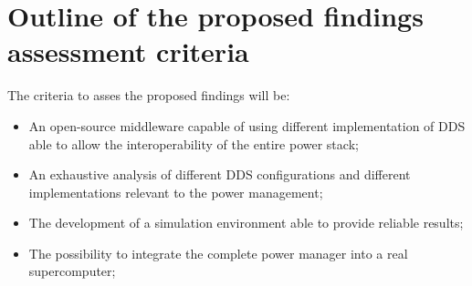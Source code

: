 \section{Outline of the proposed findings assessment criteria}
The criteria to asses the proposed findings will be:
\begin{itemize}
    \item An open-source middleware capable of using different implementation of DDS able to allow the interoperability of the entire power stack;
    \item An exhaustive analysis of different DDS configurations and different implementations relevant to the power management;
    \item The development of a simulation environment able to provide reliable results;
    \item The possibility to integrate the complete power manager into a real supercomputer;
\end{itemize}
